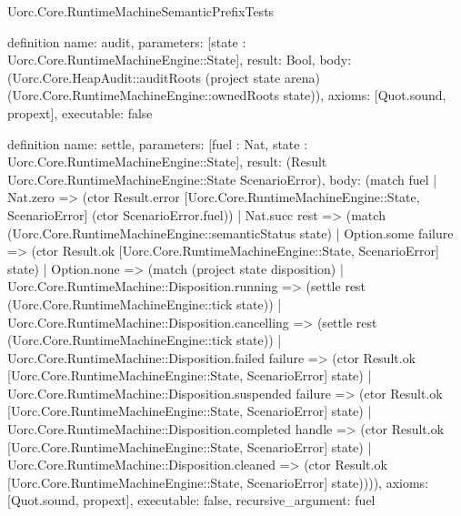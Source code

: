 \begin{lexlean}{Uorc.Core.RuntimeMachineSemanticPrefixTests}
\begin{semanticmodule}
definition{
  name: audit,
  parameters: [state : Uorc.Core.RuntimeMachineEngine::State],
  result: Bool,
  body: (Uorc.Core.HeapAudit::auditRoots (project state arena) (Uorc.Core.RuntimeMachineEngine::ownedRoots state)),
  axioms: [Quot.sound, propext],
  executable: false
}

definition{
  name: settle,
  parameters: [fuel : Nat, state : Uorc.Core.RuntimeMachineEngine::State],
  result: (Result Uorc.Core.RuntimeMachineEngine::State ScenarioError),
  body: (match fuel
    | Nat.zero => (ctor Result.error [Uorc.Core.RuntimeMachineEngine::State, ScenarioError] (ctor ScenarioError.fuel))
    | Nat.succ rest => (match (Uorc.Core.RuntimeMachineEngine::semanticStatus state)
      | Option.some failure => (ctor Result.ok [Uorc.Core.RuntimeMachineEngine::State, ScenarioError] state)
      | Option.none => (match (project state disposition)
        | Uorc.Core.RuntimeMachine::Disposition.running => (settle rest (Uorc.Core.RuntimeMachineEngine::tick state))
        | Uorc.Core.RuntimeMachine::Disposition.cancelling => (settle rest (Uorc.Core.RuntimeMachineEngine::tick state))
        | Uorc.Core.RuntimeMachine::Disposition.failed failure => (ctor Result.ok [Uorc.Core.RuntimeMachineEngine::State, ScenarioError] state)
        | Uorc.Core.RuntimeMachine::Disposition.suspended failure => (ctor Result.ok [Uorc.Core.RuntimeMachineEngine::State, ScenarioError] state)
        | Uorc.Core.RuntimeMachine::Disposition.completed handle => (ctor Result.ok [Uorc.Core.RuntimeMachineEngine::State, ScenarioError] state)
        | Uorc.Core.RuntimeMachine::Disposition.cleaned => (ctor Result.ok [Uorc.Core.RuntimeMachineEngine::State, ScenarioError] state)))),
  axioms: [Quot.sound, propext],
  executable: false,
  recursive_argument: fuel
}


\end{semanticmodule}
\end{lexlean}
